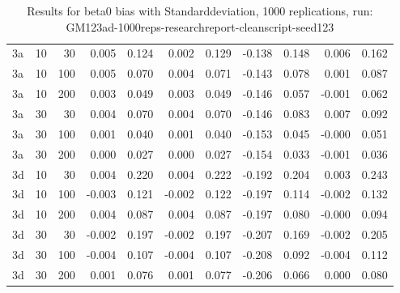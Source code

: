 \begin{table}[ht]
\begin{tabular}{lrrrrrrrrrr}
  3a & 10 & 30 & 0.005 & 0.124 & 0.002 & 0.129 & -0.138 & 0.148 & 0.006 & 0.162 \\ 
  3a & 10 & 100 & 0.005 & 0.070 & 0.004 & 0.071 & -0.143 & 0.078 & 0.001 & 0.087 \\ 
  3a & 10 & 200 & 0.003 & 0.049 & 0.003 & 0.049 & -0.146 & 0.057 & -0.001 & 0.062 \\ 
  3a & 30 & 30 & 0.004 & 0.070 & 0.004 & 0.070 & -0.146 & 0.083 & 0.007 & 0.092 \\ 
  3a & 30 & 100 & 0.001 & 0.040 & 0.001 & 0.040 & -0.153 & 0.045 & -0.000 & 0.051 \\ 
  3a & 30 & 200 & 0.000 & 0.027 & 0.000 & 0.027 & -0.154 & 0.033 & -0.001 & 0.036 \\ 
  3d & 10 & 30 & 0.004 & 0.220 & 0.004 & 0.222 & -0.192 & 0.204 & 0.003 & 0.243 \\ 
  3d & 10 & 100 & -0.003 & 0.121 & -0.002 & 0.122 & -0.197 & 0.114 & -0.002 & 0.132 \\ 
  3d & 10 & 200 & 0.004 & 0.087 & 0.004 & 0.087 & -0.197 & 0.080 & -0.000 & 0.094 \\ 
  3d & 30 & 30 & -0.002 & 0.197 & -0.002 & 0.197 & -0.207 & 0.169 & -0.002 & 0.205 \\ 
  3d & 30 & 100 & -0.004 & 0.107 & -0.004 & 0.107 & -0.208 & 0.092 & -0.004 & 0.112 \\ 
  3d & 30 & 200 & 0.001 & 0.076 & 0.001 & 0.077 & -0.206 & 0.066 & 0.000 & 0.080 \\ 
   \hline
\end{tabular}
\caption{Results for beta0 bias with Standarddeviation, 1000 replications, run: GM123ad-1000reps-researchreport-cleanscript-seed123} 
\label{tab:beta0_bias_sd}
\end{table}
